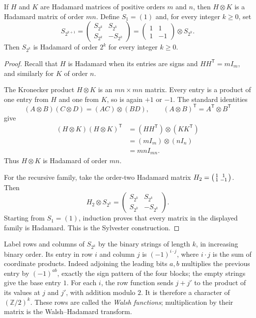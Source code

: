 \begin{proposition}[Sylvester, 1867]\label{conjectures:prop:kron}
If $H$ and $K$ are Hadamard matrices of positive orders $m$ and $n$, then
$H\otimes K$ is a Hadamard matrix of order $mn$. Define $S_1=(1)$ and,
for every integer $k\ge0$, set
\[
S_{2^{k+1}}=\begin{pmatrix}S_{2^k}&S_{2^k}\\S_{2^k}&-S_{2^k}\end{pmatrix}
=\begin{pmatrix}1&1\\1&-1\end{pmatrix}\otimes S_{2^k}.
\]
Then $S_{2^k}$ is Hadamard of order $2^k$ for every integer $k\ge0$.
\end{proposition}
\begin{proof}
Recall that $H$ is Hadamard
when its entries are signs and
$HH^{\mathsf T}=mI_m$, and similarly
for $K$ of order $n$.

The Kronecker product $H\otimes K$
is an $mn\times mn$ matrix.
Every entry is a product of one
entry from $H$ and one from $K$,
so is again $+1$ or $-1$.
The standard identities
\[
(A\otimes B)(C\otimes D)
=(AC)\otimes(BD),\qquad
(A\otimes B)^{\mathsf T}
=A^{\mathsf T}\otimes B^{\mathsf T}
\]
give
\[
\begin{aligned}
(H\otimes K)(H\otimes K)^{\mathsf T}
&=(HH^{\mathsf T})\otimes(KK^{\mathsf T})\\
&=(mI_m)\otimes(nI_n)\\
&=mnI_{mn}.
\end{aligned}
\]
Thus $H\otimes K$ is Hadamard
of order $mn$.

For the recursive family, take
the order-two Hadamard matrix
$H_2=\begin{psmallmatrix}1&1\\1&-1\end{psmallmatrix}$.
Then
\[
H_2\otimes S_{2^k}
=\begin{pmatrix}
S_{2^k}&S_{2^k}\\
S_{2^k}&-S_{2^k}
\end{pmatrix}.
\]
Starting from $S_1=(1)$,
induction proves that every
matrix in the displayed family
is Hadamard. This is the
Sylvester construction.
\end{proof}

Label rows and columns of $S_{2^k}$ by the binary strings of length $k$,
in increasing binary order. Its entry in row $i$ and column $j$ is
$(-1)^{i\cdot j}$, where $i\cdot j$ is the sum of coordinate products.
Indeed adjoining the leading bits $a,b$ multiplies the previous entry by
$(-1)^{ab}$, exactly the sign pattern of the four blocks; the empty strings
give the base entry $1$. For each $i$, the row function sends $j+j'$ to
the product of its values at $j$ and $j'$, with addition modulo $2$.
It is therefore a character of $(\mathbb Z/2)^k$. These rows are called
the \emph{Walsh functions}; multiplication by their matrix is the
Walsh--Hadamard transform.

